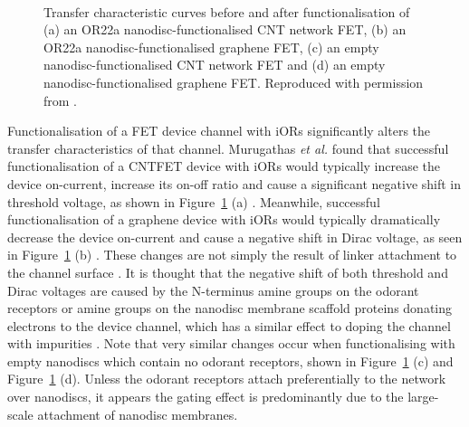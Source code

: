 \documentclass[
  a4paper,
]{scrbook}
\begin{document}
\begin{figure}
\begin{minipage}[t]{0.45\linewidth}
{{}

}

\end{minipage}%
%
\begin{minipage}[t]{0.01\linewidth}

{\centering 

~

}

\end{minipage}%

\caption{\label{fig-functionalisation-literature}Transfer characteristic
curves before and after functionalisation of (a) an OR22a
nanodisc-functionalised CNT network FET, (b) an OR22a
nanodisc-functionalised graphene FET, (c) an empty
nanodisc-functionalised CNT network FET and (d) an empty
nanodisc-functionalised graphene FET. Reproduced with permission from
\autocite{Murugathas2019a,Murugathas2020}.}

\end{figure}

Functionalisation of a FET device channel with iORs significantly alters
the transfer characteristics of that channel. Murugathas \emph{et al.}
found that successful functionalisation of a CNTFET device with iORs
would typically increase the device on-current, increase its on-off
ratio and cause a significant negative shift in threshold voltage, as
shown in Figure~\ref{fig-functionalisation-literature} (a)
\autocite{Murugathas2019a}. Meanwhile, successful functionalisation of a
graphene device with iORs would typically dramatically decrease the
device on-current and cause a negative shift in Dirac voltage, as seen
in Figure~\ref{fig-functionalisation-literature} (b)
\autocite{Murugathas2020}. These changes are not simply the result of
linker attachment to the channel surface \autocite{Murugathas2019a}. It
is thought that the negative shift of both threshold and Dirac voltages
are caused by the N-terminus amine groups on the odorant receptors or
amine groups on the nanodisc membrane scaffold proteins donating
electrons to the device channel, which has a similar effect to doping
the channel with impurities
\autocite{Bradley2004,Murugathas2019a,Murugathas2020}. Note that very
similar changes occur when functionalising with empty nanodiscs which
contain no odorant receptors, shown in
Figure~\ref{fig-functionalisation-literature} (c) and
Figure~\ref{fig-functionalisation-literature} (d). Unless the odorant
receptors attach preferentially to the network over nanodiscs, it
appears the gating effect is predominantly due to the large-scale
attachment of nanodisc membranes.
\end{document}
